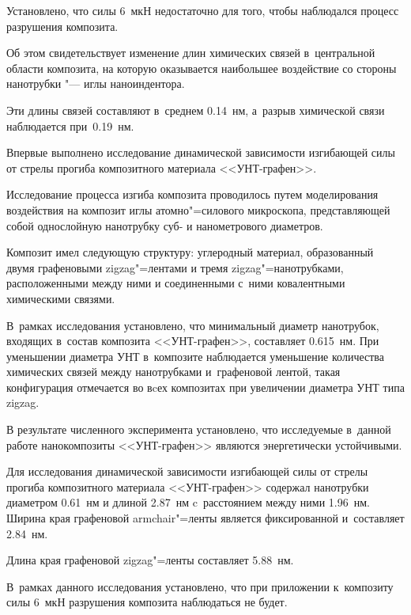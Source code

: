 Установлено, что силы 6~мкН недостаточно для того, чтобы наблюдался процесс разрушения композита. 

Об этом свидетельствует изменение длин химических связей в~центральной области композита, на которую оказывается наибольшее воздействие со стороны нанотрубки "--- иглы наноиндентора. 

Эти длины связей составляют в~среднем 0.14~нм, а~разрыв химической связи наблюдается при~0.19~нм.












Впервые выполнено исследование динамической зависимости изгибающей силы от стрелы прогиба композитного материала <<УНТ-графен>>. 

Исследование процесса изгиба композита проводилось путем моделирования воздействия на композит иглы атомно"=силового микроскопа, представляющей собой однослойную нанотрубку суб- и нанометрового диаметров. 

Композит имел следующую структуру: углеродный материал, образованный двумя графеновыми zigzag"=лентами и тремя zigzag"=нанотрубками, расположенными между ними и соединенными с~ними ковалентными химическими связями. 

В~рамках исследования установлено, что минимальный диаметр нанотрубок, входящих в~состав композита <<УНТ-графен>>, составляет 0.615~нм. При уменьшении диаметра УНТ в~композите наблюдается уменьшение количества химических связей между нанотрубками и~графеновой лентой, такая конфигурация отмечается во вcех композитах при увеличении диаметра УНТ типа zigzag.



В результате численного эксперимента установлено, что исследуемые в~данной работе нанокомпозиты <<УНТ-графен>> являются энергетически устойчивыми. 

Для исследования динамической зависимости изгибающей силы от стрелы прогиба композитного материала <<УНТ-графен>> содержал нанотрубки диаметром 0.61~нм  и длиной 2.87~нм c~расстоянием между ними  1.96~нм. Ширина края графеновой armchair"=ленты является фиксированной и~составляет 2.84~нм. 

Длина края графеновой zigzag"=ленты составляет 5.88~нм. 

В~рамках данного исследования установлено, что при приложении к~композиту силы 6~мкН разрушения композита наблюдаться не будет.



